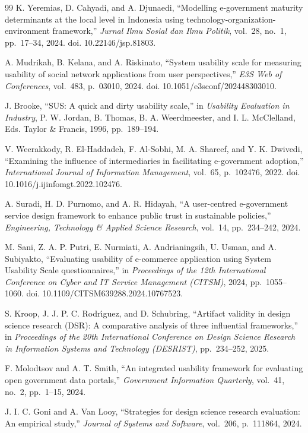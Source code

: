 \documentclass[conference,a4paper]{IEEEtran}
\begin{document}
\begin{thebibliography}{99}
 K. Yeremias, D. Cahyadi, and A. Djunaedi, ``Modelling e-government maturity determinants at the local level in Indonesia using technology-organization-environment framework,'' \emph{Jurnal Ilmu Sosial dan Ilmu Politik}, vol.~28, no.~1, pp.~17--34, 2024. doi. 10.22146/jsp.81803.

 A. Mudrikah, B. Kelana, and A. Riskinato, ``System usability scale for measuring usability of social network applications from user perspectives,'' \emph{E3S Web of Conferences}, vol.~483, p.~03010, 2024. doi. 10.1051/e3sconf/202448303010.

 J. Brooke, ``SUS: A quick and dirty usability scale,'' in \emph{Usability Evaluation in Industry}, P. W. Jordan, B. Thomas, B. A. Weerdmeester, and I. L. McClelland, Eds. Taylor \& Francis, 1996, pp.~189--194.

 V. Weerakkody, R. El-Haddadeh, F. Al-Sobhi, M. A. Shareef, and Y. K. Dwivedi, ``Examining the influence of intermediaries in facilitating e-government adoption,'' \emph{International Journal of Information Management}, vol.~65, p.~102476, 2022. doi. 10.1016/j.ijinfomgt.2022.102476.

 A. Suradi, H. D. Purnomo, and A. R. Hidayah, ``A user-centred e-government service design framework to enhance public trust in sustainable policies,'' \emph{Engineering, Technology \& Applied Science Research}, vol.~14, pp.~234--242, 2024.

 M. Sani, Z. A. P. Putri, E. Nurmiati, A. Andrianingsih, U. Usman, and A. Subiyakto, ``Evaluating usability of e-commerce application using System Usability Scale questionnaires,'' in \emph{Proceedings of the 12th International Conference on Cyber and IT Service Management (CITSM)}, 2024, pp.~1055--1060. doi. 10.1109/CITSM639288.2024.10767523.

 S. Kroop, J. J. P. C. Rodr\'{\i}guez, and D. Schubring, ``Artifact validity in design science research (DSR): A comparative analysis of three influential frameworks,'' in \emph{Proceedings of the 20th International Conference on Design Science Research in Information Systems and Technology (DESRIST)}, pp.~234--252, 2025.

 F. Molodtsov and A. T. Smith, ``An integrated usability framework for evaluating open government data portals,'' \emph{Government Information Quarterly}, vol.~41, no.~2, pp.~1--15, 2024.

 J. I. C. Goni and A. Van Looy, ``Strategies for design science research evaluation: An empirical study,'' \emph{Journal of Systems and Software}, vol.~206, p.~111864, 2024.

\end{thebibliography}
\end{document}

